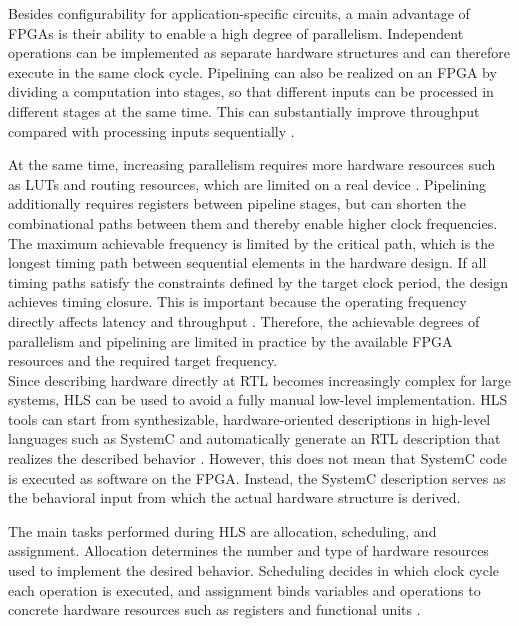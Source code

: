         Besides configurability for application-specific circuits, a main advantage of \ac{FPGA}s is their ability to enable a high degree of parallelism. Independent operations can be implemented as separate hardware structures and can therefore execute in the same clock cycle. Pipelining can also be realized on an FPGA by dividing a computation into stages, so that different inputs can be processed in different stages at the same time. This can substantially improve throughput compared with processing inputs sequentially \cite{fang_-memory_2020}. 

        At the same time, increasing parallelism requires more hardware resources such as \ac{LUT}s and routing resources, which are limited on a real device \cite{fang_-memory_2020}. Pipelining additionally requires registers between pipeline stages, but can shorten the combinational paths between them and thereby enable higher clock frequencies. The maximum achievable frequency is limited by the critical path, which is the longest timing path between sequential elements in the hardware design. If all timing paths satisfy the constraints defined by the target clock period, the design achieves timing closure. This is important because the operating frequency directly affects latency and throughput \cite{zheng_fast_2014}. Therefore, the achievable degrees of parallelism and pipelining are limited in practice by the available FPGA resources and the required target frequency.\\
        
         Since describing hardware directly at \ac{RTL} becomes increasingly complex for large systems, \ac{HLS} can be used to avoid a fully manual low-level implementation. \ac{HLS} tools can start from synthesizable, hardware-oriented descriptions in high-level languages such as SystemC and automatically generate an \ac{RTL} description that realizes the described behavior \cite{nane_survey_2016}. However, this does not mean that SystemC code is executed as software on the \ac{FPGA}. Instead, the SystemC description serves as the behavioral input from which the actual hardware structure is derived.

        The main tasks performed during \ac{HLS} are allocation, scheduling, and assignment. Allocation determines the number and type of hardware resources used to implement the desired behavior. Scheduling decides in which clock cycle each operation is executed, and assignment binds variables and operations to concrete hardware resources such as registers and functional units \cite{cheng_novel_2007}. 
        
